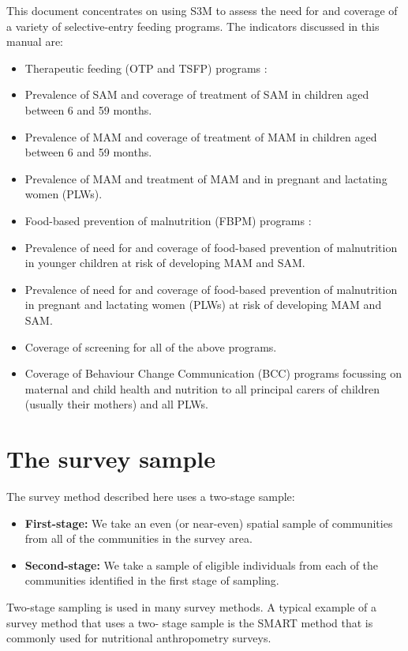 \documentclass[12pt,a4paper]{book}
\theoremstyle{definition}
\theoremstyle{definition}
\theoremstyle{definition}
\theoremstyle{remark}
\begin{document}
This document concentrates on using S3M to assess the need for and
coverage of a variety of selective-entry feeding programs. The
indicators discussed in this manual are:

\begin{itemize}
\item
  Therapeutic feeding (OTP and TSFP) programs :
\item
  Prevalence of SAM and coverage of treatment of SAM in children aged
  between 6 and 59 months.
\item
  Prevalence of MAM and coverage of treatment of MAM in children aged
  between 6 and 59 months.
\item
  Prevalence of MAM and treatment of MAM and in pregnant and lactating
  women (PLWs).
\item
  Food-based prevention of malnutrition (FBPM) programs :
\item
  Prevalence of need for and coverage of food-based prevention of
  malnutrition in younger children at risk of developing MAM and SAM.
\item
  Prevalence of need for and coverage of food-based prevention of
  malnutrition in pregnant and lactating women (PLWs) at risk of
  developing MAM and SAM.
\item
  Coverage of screening for all of the above programs.
\item
  Coverage of Behaviour Change Communication (BCC) programs focussing on
  maternal and child health and nutrition to all principal carers of
  children (usually their mothers) and all PLWs.
\end{itemize}

\hypertarget{sample}{%
\chapter{The survey sample}\label{sample}}

The survey method described here uses a two-stage sample:

\begin{itemize}
\item
  \textbf{First-stage:} We take an even (or near-even) spatial sample of
  communities from all of the communities in the survey area.
\item
  \textbf{Second-stage:} We take a sample of eligible individuals from
  each of the communities identified in the first stage of sampling.
\end{itemize}

Two-stage sampling is used in many survey methods. A typical example of
a survey method that uses a two- stage sample is the SMART method that
is commonly used for nutritional anthropometry surveys.
\end{document}
